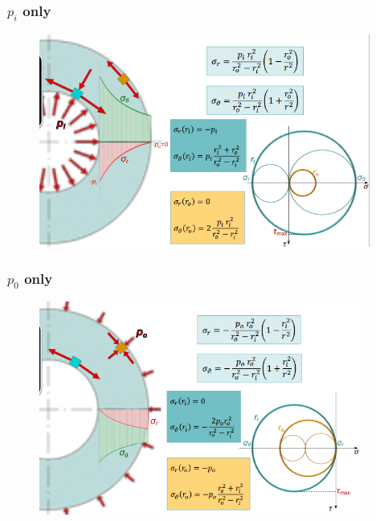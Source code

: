 \documentclass[class=report, crop=false, 12pt,a4paper]{standalone}
\begin{document}
\subsubsection{$p_i$ only}
\begin{figure}[H]
    \centering
    \includegraphics[height = 7cm]{../img/diagram114.png}
    \caption{}
\end{figure}
\subsubsection{$p_0$ only}
\begin{figure}[H]
    \centering
    \includegraphics[height = 7cm]{../img/diagram115.png}
    \caption{}
\end{figure}
\end{document}
